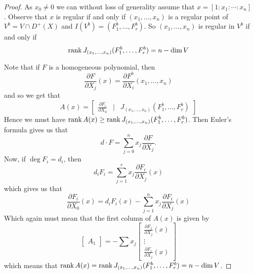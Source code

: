 \begin{proof}
As $x_0\neq 0$ we can without loss of generality assume that $x = [1:x_1:\cdots :x_n]$. Observe that $x$ is regular if and only if $(x_1, \ldots, x_n)$ is a regular point of $V^b = V\cap D^+(X)$ and $I(V^b) = (F_1^b, \ldots, F_r^b)$. So $(x_1, \ldots, x_n)$ is regular in $V^b$ if and only if
\begin{equation*}
    \operatorname{rank} J_{(x_1, \ldots, x_n)}(F_1^b, \ldots, F_r^b) = n-\dim V
\end{equation*}

Note that if $F$ is a homogeneous polynomial, then
\begin{equation*}
    \frac{\partial F}{\partial X_j}(x) = \frac{\partial F^b}{\partial X_i}(x_1, \ldots, x_n)
\end{equation*}
and so we get that
\begin{equation*}
    A(x) = 
    \begin{bmatrix}
    \frac{\partial F_i}{\partial X_0} &\vert & J_{(x_1, \ldots, x_n)}(F_1^b, \ldots, F_r^b)
    \end{bmatrix}
\end{equation*}
Hence we must have $\operatorname{rank} A(x)\geq \operatorname{rank} J_{(x_1, \ldots, x_n)}(F_1^b, \ldots, F_r^b)$. Then Euler's formula gives us that 
\begin{equation*}
    d\cdot F = \sum_{j=0}^n x_j \frac{\partial F}{\partial X_j}.
\end{equation*}
Now, if $\deg F_i = d_i$, then 
\begin{equation*}
    d_i F_i = \sum_{j=1}^r x_j\frac{\partial F_i}{\partial X_j}(x)
\end{equation*}
which gives us that
\begin{equation*}
    \frac{\partial F_i}{\partial X_0}(x) = d_i F_i(x) - \sum_{j=1}^n x_j \frac{\partial F_i}{\partial X_j}(x)
\end{equation*}
Which again must mean that the first column of $A(x)$ is given by 
\begin{equation*}
    \begin{bmatrix}
    A_1
    \end{bmatrix}
    =
    -\sum x_j
    \begin{bmatrix}
    \frac{\partial F_1}{\partial X_j}(x) \\
    \vdots \\
    \frac{\partial F_r}{\partial X_j}(x)
    \end{bmatrix}
\end{equation*}
which means that $\operatorname{rank} A(x) = \operatorname{rank} J_{(x_1, \ldots, x_n)}(F_1^b, \ldots, F_r^b) = n-\dim V$.
\end{proof}

